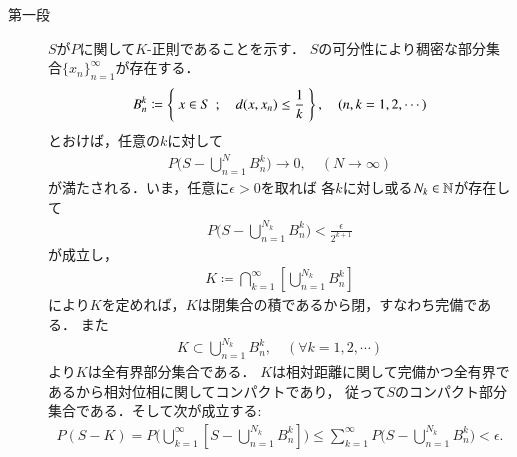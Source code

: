 	\begin{prf}\mbox{}
		\begin{description}
			\item[第一段]
				$S$が$P$に関して$K$-正則であることを示す．
				$S$の可分性により稠密な部分集合$\{x_n\}_{n=1}^\infty$が存在する．
				\begin{align}
					B_n^k \coloneqq \left\{\ x \in S\ \, ; \quad d(x,x_n) \leq \frac{1}{k}\ \right\},
					\quad (n,k=1,2,\cdots)
				\end{align}
				とおけば，任意の$k$に対して
				\begin{align}
					P\Biggl( S - \bigcup_{n=1}^N B_n^k \Biggr)
					\longrightarrow 0,
					\quad (N \longrightarrow \infty)
				\end{align}
				が満たされる．いま，任意に$\epsilon > 0$を取れば
				各$k$に対し或る$N_k \in \mathbb{N}$が存在して
				\begin{align}
					P\Biggl( S - \bigcup_{n=1}^{N_k} B_n^k \Biggr)
					< \frac{\epsilon}{2^{k+1}}
				\end{align}
				が成立し，
				\begin{align}
					K \coloneqq \bigcap_{k=1}^\infty \left[ \bigcup_{n=1}^{N_k} B_n^k \right]
				\end{align}
				により$K$を定めれば，$K$は閉集合の積であるから閉，すなわち完備である．
				また
				\begin{align}
					K \subset \bigcup_{n=1}^{N_k} B_n^k,
					\quad (\forall k=1,2,\cdots)
				\end{align}
				より$K$は全有界部分集合である．
				$K$は相対距離に関して完備かつ全有界であるから相対位相に関してコンパクトであり，
				従って$S$のコンパクト部分集合である．そして次が成立する:
				\begin{align}
					P(S - K)
					= P\Biggl( \bigcup_{k=1}^\infty \left[S - \bigcup_{n=1}^{N_k} B_n^k \right] \Biggr)
					\leq \sum_{k=1}^\infty P\Biggl(S - \bigcup_{n=1}^{N_k} B_n^k\Biggr)
					< \epsilon.
				\end{align}
				

\end{description}
\end{prf}
